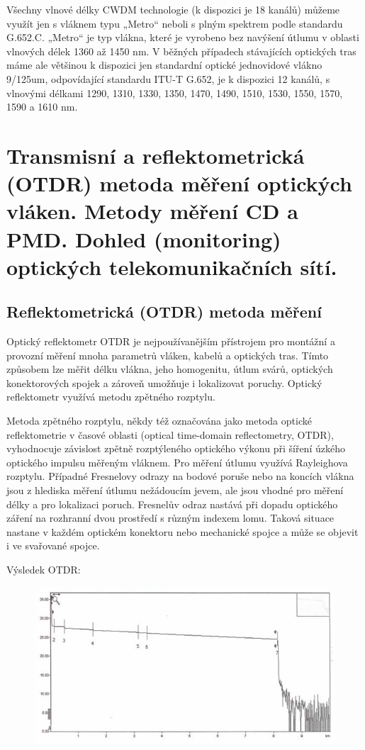 Všechny vlnové délky CWDM technologie (k dispozici je 18 kanálů) můžeme využít jen s vláknem typu „Metro“ neboli s plným spektrem podle standardu G.652.C. „Metro“ je typ vlákna, které je vyrobeno bez navýšení útlumu v oblasti vlnových délek 1360 až 1450 nm. V běžných případech stávajících optických tras máme ale většinou k dispozici jen standardní optické jednovidové vlákno 9/125um, odpovídající standardu ITU-T G.652, je k dispozici 12 kanálů, s vlnovými délkami 1290, 1310, 1330, 1350, 1470, 1490, 1510, 1530, 1550, 1570, 1590 a 1610 nm. 

\clearpage
\section{Transmisní a reflektometrická (OTDR) metoda měření optických vláken. Metody měření CD a PMD. Dohled (monitoring) optických telekomunikačních sítí.}

\subsection{Reflektometrická (OTDR) metoda měření}
Optický reflektometr OTDR je nejpoužívanějším přístrojem pro montážní a provozní měření mnoha parametrů vláken, kabelů a optických tras. Tímto způsobem lze měřit délku vlákna, jeho homogenitu, útlum svárů, optických konektorových spojek a zároveň umožňuje i lokalizovat poruchy. Optický reflektometr využívá metodu zpětného rozptylu.

Metoda zpětného rozptylu, někdy též označována jako metoda optické reflektometrie v časové oblasti (optical time-domain reflectometry, OTDR), vyhodnocuje závislost zpětně rozptýleného optického výkonu při šíření úzkého optického impulsu měřeným vláknem. Pro měření útlumu využívá Rayleighova rozptylu. Případné Fresnelovy odrazy na bodové poruše nebo na koncích vlákna jsou z hlediska měření útlumu nežádoucím jevem, ale jsou vhodné pro měření délky a pro lokalizaci poruch. Fresnelův odraz nastává při dopadu optického záření na rozhranní dvou prostředí s různým indexem lomu. Taková situace nastane v každém optickém konektoru nebo mechanické spojce a může se objevit i ve svařované spojce.

Výsledek OTDR:
\begin{figure}[!ht]
\begin{center}
    \includegraphics[scale=0.5]{obrazky/zpetroz.png}
  \end{center}
\end{figure}

